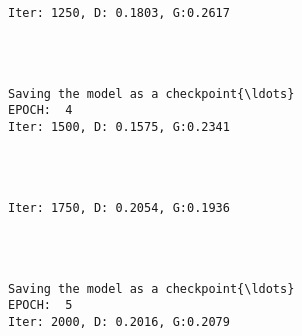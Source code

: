 \documentclass[11pt]{article}
\begin{document}
    \begin{Verbatim}[commandchars=\\\{\}]

Iter: 1250, D: 0.1803, G:0.2617
    \end{Verbatim}

    \begin{center}
    \end{center}
    { \hspace*{\fill} \\}
    
    \begin{Verbatim}[commandchars=\\\{\}]

Saving the model as a checkpoint{\ldots}
EPOCH:  4
Iter: 1500, D: 0.1575, G:0.2341
    \end{Verbatim}

    \begin{center}
    \end{center}
    { \hspace*{\fill} \\}
    
    \begin{Verbatim}[commandchars=\\\{\}]

Iter: 1750, D: 0.2054, G:0.1936
    \end{Verbatim}

    \begin{center}
    \end{center}
    { \hspace*{\fill} \\}
    
    \begin{Verbatim}[commandchars=\\\{\}]

Saving the model as a checkpoint{\ldots}
EPOCH:  5
Iter: 2000, D: 0.2016, G:0.2079
    \end{Verbatim}

    \begin{center}
    \end{center}
    { \hspace*{\fill} \\}
    
\end{document}
